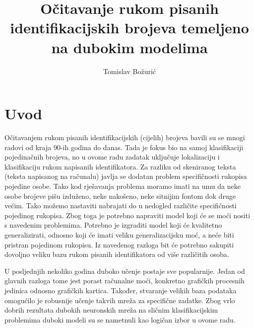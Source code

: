 \documentclass[times, utf8, diplomski]{fer}
\theoremstyle{definition}
\begin{document}

\title{Očitavanje rukom pisanih identifikacijskih brojeva temeljeno
na dubokim modelima}

\author{Tomislav Božurić}
\maketitle

\izvornik


\tableofcontents
\listoffigures
\listoftables

\chapter{Uvod}
Očitavanjem rukom pisanih identifikacijskih (cijelih) brojeva bavili su se mnogi radovi od kraja 90-ih godina do danas. Tada je fokus bio na samoj klasifikaciji pojedinačnih brojeva, no u ovome radu zadatak uključuje lokalizaciju i klasifikaciju rukom napisanih identifikatora. Za razliku od skeniranog teksta (teksta napisanog na računalu) javlja se dodatan problem specifičnosti rukopisa pojedine osobe. Tako kod rješavanja problema moramo imati na umu da neke osobe brojeve pišu izduženo, neke nakošeno, neke sitnijim fontom dok druge većim. Tako možemo nastaviti nabrajati do u nedogled različite specifičnosti pojedinog rukopisa. Zbog toga je potrebno napraviti model koji će se moći nositi s navedenim problemima. Potrebno je izgraditi model koji će kvalitetno generalizirati, odnosno koji će imati veliku generalizacijsku moć, a neće biti pristran pojedinom rukopisu. Iz navedenog razloga bit će potrebno sakupiti dovoljno veliku bazu rukom pisanih identifikatora od više različitih osoba. 

U posljednjih nekoliko godina duboko učenje postaje sve popularnije. Jedan od glavnih razloga tome jest porast računalne moći, konkretno grafičkih procesnih jedinica  odnosno grafičkih kartica. Također, stvaranje velikih baza podataka omogućilo je robusnije  učenje takvih mreža za specifične zadatke. Zbog vrlo dobrih rezultata dubokih neuronskih mreža na sličnim klasifikacijskim problemima duboki modeli su se nametnuli kao logičan izbor u ovome radu.
\end{document}
